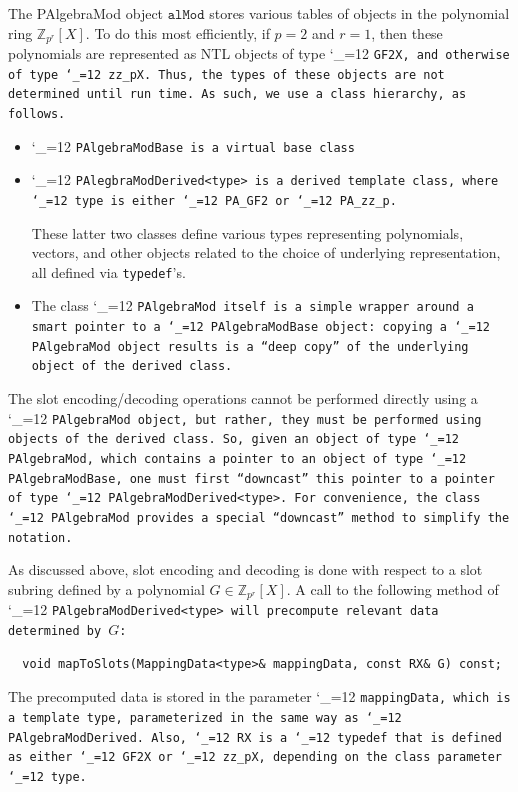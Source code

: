 \documentclass[14pt]{extarticle}
\newcommand{\Z}{\mathbb{Z}}
\def\PAlgebraMod{\textsf{PAlgebraMod}}
\def\var#1{\ensuremath{\mathtt{#1}}}
\def\class{%
\begingroup\catcode`\_=12\relax
\classwitharg}
\def\classwitharg#1{\tt #1\endgroup}
\begin{document}
The {\PAlgebraMod} object \var{alMod} stores various tables
of objects in the polynomial ring $\Z_{p^r}[X]$.  To do this most 
efficiently, if $p = 2$ and $r = 1$, then these polynomials
are represented as NTL objects of type \class{GF2X}, 
and otherwise of type \class{zz_pX}. 
Thus, the types of these objects are not determined until run time.
As such, we use a class hierarchy, as follows.
\begin{itemize}
\item
\class{PAlgebraModBase} is a virtual base class

\item
\class{PAlegbraModDerived<type>} is a derived template class, where
\class{type} is either \class{PA_GF2} or \class{PA_zz_p}.

These latter two classes define various types representing
polynomials, vectors, and other objects related to the choice of
underlying representation, all defined via {\tt typedef}'s.

\item
The class \class{PAlgebraMod} itself is a simple 
wrapper around a smart pointer to a
\class{PAlgebraModBase} object: copying a \class{PAlgebraMod} 
object results is
a ``deep copy'' of the underlying object of the derived class.
\end{itemize}

The slot encoding/decoding operations 
cannot be performed directly using a \class{PAlgebraMod}
object, but rather, they must be performed using objects
of the derived class.
So, given an object of type \class{PAlgebraMod},
which contains a pointer to an object of type
\class{PAlgebraModBase}, one must first 
 ``downcast'' this pointer to a pointer of type
\class{PAlgebraModDerived<type>}.
For convenience, the class \class{PAlgebraMod}
provides a special ``downcast'' method to simplify the notation.

As discussed above, slot encoding and decoding is done
with respect to a slot subring defined by a polynomial
$G \in \Z_{p^r}[X]$.
A call to the following method of \class{PAlgebraModDerived<type>}
will precompute relevant data determined by $G$:
\begin{verbatim}
  void mapToSlots(MappingData<type>& mappingData, const RX& G) const;
\end{verbatim}
The precomputed data is stored in the parameter \class{mappingData},
which is a template type, parameterized in the same
way as \class{PAlgebraModDerived}.
Also, \class{RX} is a \class{typedef}
that is defined as either \class{GF2X} or \class{zz_pX},
depending on the class parameter \class{type}.
\end{document}
